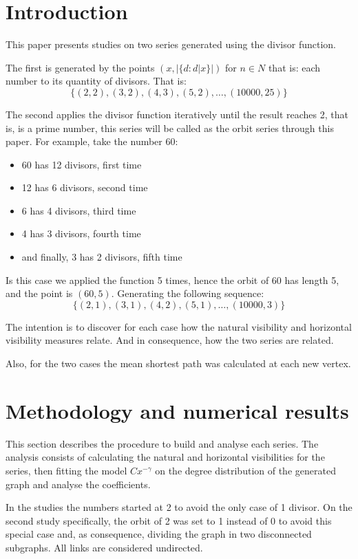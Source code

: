\documentclass[a4paper,12pt]{article}
\begin{document}
\newpage

\section{Introduction}

This paper presents studies on two series generated using the divisor
function.

The first is generated by the points $(x,|\{d : d|x\}|)$ for $n\in N$
that is: each number to its quantity of divisors. That is:
$$\{(2,2), (3,2), (4,3), (5,2),\ldots, (10000,25)\}$$

The second applies the divisor function iteratively until the result reaches
2, that is, is a prime number, this series will be called as the orbit series
through this paper. For example, take the number 60:

\begin{itemize}
    \item 60 has 12 divisors, first time
    \item 12 has 6 divisors, second time
    \item 6 has 4 divisors, third time
    \item 4 has 3 divisors, fourth time
    \item and finally, 3 has 2 divisors, fifth time
\end{itemize}

Is this case we applied the function 5 times, hence the orbit of 60
has length 5, and the point is $(60, 5)$. Generating the following sequence:
$$\{(2,1), (3,1), (4,2), (5,1),\ldots, (10000,3)\}$$

The intention is to discover for each case how the natural visibility and
horizontal visibility measures relate. And in consequence, how the two
series are related.

Also, for the two cases the mean shortest path was calculated at each new
vertex.

\section{Methodology and numerical results}

This section describes the procedure to build and analyse each series.
The analysis consists of calculating the natural and horizontal visibilities
for the series, then fitting the model $Cx^{-\gamma}$ on the degree distribution
of the generated graph and analyse the coefficients.

In the studies the numbers started at 2 to avoid the only case of 1
divisor. On the second study specifically, the orbit of 2 was set to 1
instead of 0 to avoid this special case and, as consequence, dividing
the graph in two disconnected subgraphs.
All links are considered undirected.
\end{document}
